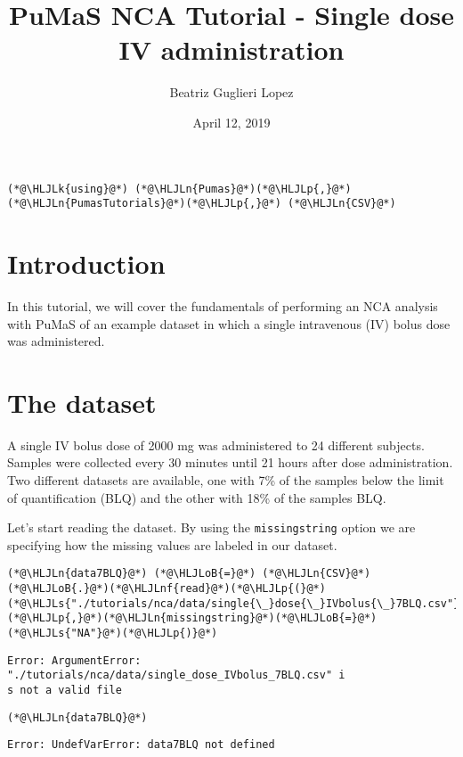 \documentclass[12pt,a4paper]{article}
\title{ PuMaS NCA Tutorial - Single dose IV administration }
\author{ Beatriz Guglieri Lopez }
\date{ April 12, 2019 }
\newcommand{\HLJLk}[1]{\textcolor[RGB]{148,91,176}{\textbf{#1}}}
\newcommand{\HLJLn}[1]{#1}
\newcommand{\HLJLnf}[1]{\textcolor[RGB]{66,102,213}{#1}}
\newcommand{\HLJLs}[1]{\textcolor[RGB]{201,61,57}{#1}}
\newcommand{\HLJLoB}[1]{\textcolor[RGB]{102,102,102}{\textbf{#1}}}
\newcommand{\HLJLp}[1]{#1}
\begin{document}
\maketitle


\begin{lstlisting}
(*@\HLJLk{using}@*) (*@\HLJLn{Pumas}@*)(*@\HLJLp{,}@*) (*@\HLJLn{PumasTutorials}@*)(*@\HLJLp{,}@*) (*@\HLJLn{CSV}@*)
\end{lstlisting}


\section{Introduction}
In this tutorial, we will cover the fundamentals of performing an NCA analysis with PuMaS of an example dataset in which a single intravenous (IV) bolus dose was administered.

\section{The dataset}
A single IV bolus dose of 2000 mg was administered to 24 different subjects. Samples were collected every 30 minutes until 21 hours after dose administration. Two different datasets are available, one with 7\% of the samples below the limit of quantification (BLQ) and the other with 18\% of the samples BLQ.

Let's start reading the dataset. By using the \texttt{missingstring} option we are specifying how the missing values are labeled in our dataset.


\begin{lstlisting}
(*@\HLJLn{data7BLQ}@*) (*@\HLJLoB{=}@*) (*@\HLJLn{CSV}@*)(*@\HLJLoB{.}@*)(*@\HLJLnf{read}@*)(*@\HLJLp{(}@*)(*@\HLJLs{"./tutorials/nca/data/single{\_}dose{\_}IVbolus{\_}7BLQ.csv"}@*)(*@\HLJLp{,}@*)(*@\HLJLn{missingstring}@*)(*@\HLJLoB{=}@*)(*@\HLJLs{"NA"}@*)(*@\HLJLp{)}@*)
\end{lstlisting}

\begin{lstlisting}
Error: ArgumentError: "./tutorials/nca/data/single_dose_IVbolus_7BLQ.csv" i
s not a valid file
\end{lstlisting}


\begin{lstlisting}
(*@\HLJLn{data7BLQ}@*)
\end{lstlisting}

\begin{lstlisting}
Error: UndefVarError: data7BLQ not defined
\end{lstlisting}
\end{document}
